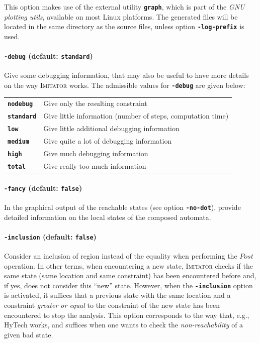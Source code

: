 \documentclass[a4paper,10pt]{article}
\newcommand{\hytech}{{\sc HyTech}}
\newcommand{\imitator}{\textsc{Imitator}}
\newcommand{\code}[1]{\textbf{\texttt{#1}}}
\begin{document}
This option makes use of the external utility \code{graph}, which is
part of the \emph{GNU plotting utils}, available on most Linux
platforms. The generated files will be located in the same directory
as the source files, unless option \code{-log-prefix} is used.

\paragraph{\code{-debug} (default: \code{standard})}

Give some debugging information, that may also be useful to have more details on the way \imitator{} works.
The admissible values for \code{-debug} are given below:

\begin{tabular}{@{} l @{\ \ } l}
 \code{nodebug} & Give only the resulting constraint \\
 \code{standard} & Give little information (number of steps, computation time)\\
 \code{low} & Give little additional debugging information\\
 \code{medium} & Give quite a lot of debugging information\\
 \code{high} & Give much debugging information\\
 \code{total} & Give really too much information\\
\end{tabular}

\paragraph{\code{-fancy} (default: \code{false})}

In the graphical output of the reachable states (see option \code{-no-dot}), 
provide detailed information on the local states of the composed automata.

\paragraph{\code{-inclusion} (default: \code{false})}
Consider an inclusion of region instead of the equality when performing the $\mathit{Post}$ operation.
In other terms, when encountering a new state, \imitator{} checks if the same state (same location and same constraint) has been encountered before and, if yes, does not consider this ``new'' state.
However, when the \code{-inclusion} option is activated, it suffices that a previous state with the same location and a constraint \emph{greater or equal} to the constraint of the new state has been encountered to stop the analysis.
This option corresponds to the way that, e.g., \hytech{} works, and suffices when one wants to check the \emph{non-reachability} of a given bad state.
\end{document}
